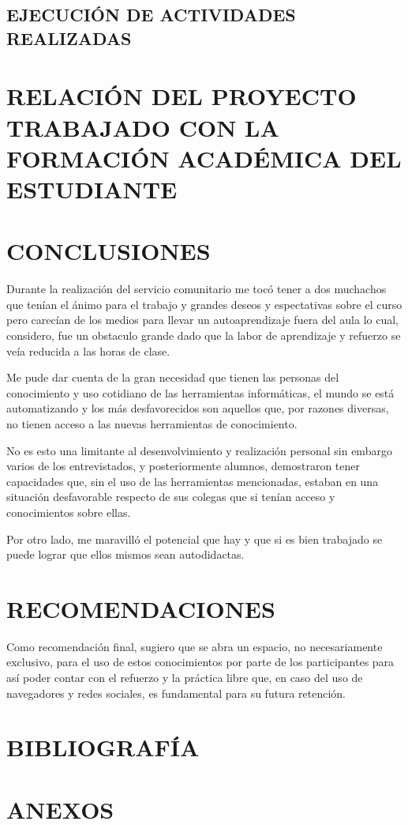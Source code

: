 \documentclass[letterpaper,12pt]{article}
\begin{document}
        \subsection{EJECUCIÓN DE ACTIVIDADES REALIZADAS}
	\pagebreak
	
	\section{RELACIÓN DEL PROYECTO TRABAJADO CON LA FORMACIÓN ACADÉMICA	DEL\\ ESTUDIANTE}
	\pagebreak
	
	\section{CONCLUSIONES}
    Durante la realización del servicio comunitario me tocó tener a dos muchachos que tenían el ánimo para el trabajo y grandes deseos y espectativas sobre el curso pero carecían de los medios para llevar un autoaprendizaje fuera del aula lo cual, considero,
    fue un obstaculo grande dado que la labor de aprendizaje y refuerzo se veía reducida a las horas de clase.
    
    Me pude dar cuenta de la gran necesidad que tienen las personas del conocimiento y uso cotidiano de las herramientas informáticas, el mundo se está automatizando y los más desfavorecidos son aquellos que, por razones diversas, no tienen acceso a las nuevas herramientas de conocimiento.
    
    No es esto una limitante al desenvolvimiento y realización personal sin embargo varios de los entrevistados, y posteriormente alumnos, demostraron tener capacidades que, sin el uso de las herramientas mencionadas, estaban en una situación desfavorable respecto de sus colegas que si tenían acceso y conocimientos sobre ellas.
    
    Por otro lado, me maravilló el potencial que hay y que si es bien trabajado se puede
    lograr que ellos mismos sean autodidactas.    
	\pagebreak
    
    \section{RECOMENDACIONES}
	Como recomendación final, sugiero que se abra un espacio, no necesariamente exclusivo, para el uso de estos conocimientos por parte de los participantes para así poder contar con el refuerzo y la práctica libre que, en caso del uso de navegadores y redes sociales, es fundamental para su futura retención.
    \pagebreak
    
	\section{BIBLIOGRAFÍA}
	\pagebreak
	
	\section{ANEXOS}
\end{document}
